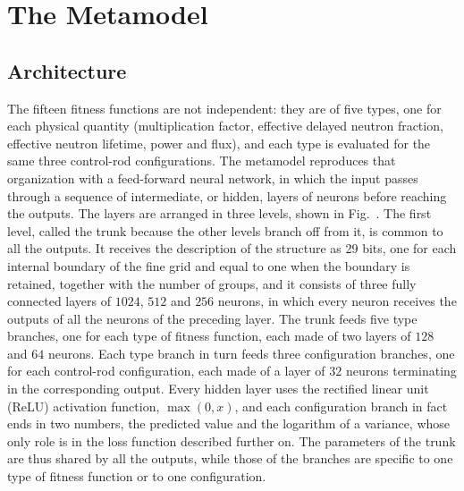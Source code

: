 \section{The Metamodel}

\subsection{Architecture}

The fifteen fitness functions are not independent: they are of five types, one
for each physical quantity (multiplication factor, effective delayed neutron
fraction, effective neutron lifetime, power and flux), and each type is
evaluated for the same three control-rod configurations. The metamodel
reproduces that organization with a feed-forward neural network, in which the
input passes through a sequence of intermediate, or hidden, layers of neurons
before reaching the outputs. The layers are arranged in three levels, shown in
Fig.~. The first level, called the trunk because the other levels branch off from it, is
common to all the outputs. It receives the description of the structure as 29
bits, one for each internal boundary of the fine grid and equal to one when the
boundary is retained, together with the number of groups, and it consists of
three fully connected layers of $1024$, $512$ and $256$ neurons, in which every
neuron receives the outputs of all the neurons of the preceding layer. The
trunk feeds five type branches, one for each type of fitness function, each made
of two layers of $128$ and $64$ neurons. Each type branch in turn feeds three
configuration branches, one for each control-rod configuration, each made of a
layer of $32$ neurons terminating in the corresponding output. Every hidden
layer uses the rectified linear unit (ReLU) activation function, $\max(0,x)$,
and each configuration branch in fact ends in two numbers, the predicted value
and the logarithm of a variance, whose only role is in the loss function
described further on. The parameters of the trunk are thus shared by all the
outputs, while those of the branches are specific to one type of fitness
function or to one configuration.

